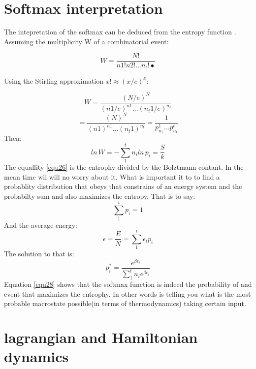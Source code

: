 \documentclass[journal]{IEEEtai}
\begin{document}
\section{Softmax interpretation}

The intepretation of the softmax can be deduced from the entropy function \cite{MDF}. Assuming the multiplicity $\text{W}$ of a combinatorial event:

\begin{equation}\label{equ23}
W = \frac{N!}{n1!n2!...n_{t}!•}
\end{equation}

Using the Stirling approximation $x!\approx(x/e)^{x}$:

\begin{equation}\label{equ24}
W = \frac{(N/e)^{N}}{(n1/e)^{n1}...(n_{t}1/e)^{n_{t}}}
\end{equation}
\begin{equation}\label{equ25}
= \frac{(N)^{N}}{(n1)^{n1}...(n_{t}1)^{n_{t}}}=\frac{1}{p^{1}_{n_{1}}...p^{t}_{n_{t}}}
\end{equation}
Then:
\begin{equation}\label{equ26}
ln\, W =- \sum^{t}_{1}n_{i}ln\,p_{i} = \frac{S}{k}
\end{equation}
The equallity \eqref{equ26} is the entrophy divided by the Bolztmann contant. In the mean time wil will no worry about it. What is important it to to find a probablity distribution that obeys that constrains of an energy system and the probabilty sum and also maximizes the entropy. That is to say:
\begin{equation}\label{equ26}
\sum^{t}_{1}p_{i} = 1
\end{equation}
And the average energy: 
\begin{equation}\label{equ27}
\epsilon=\frac{E}{N} = \sum^{t}_{1}\epsilon_{i}p_{i}
\end{equation}
The solution to that is:
\begin{equation}\label{equ28}
p^{*}_{i} = \frac{e^{\beta\epsilon_{i}}}{\sum^{t}_{1}n_{i}e^{\beta\epsilon_{i}}}
\end{equation}
Equation \eqref{equ28} shows that the softmax function is indeed the probability of and event that maximizes the entrophy. In other words is telling you what is the most probable macrostate possible(in terms of thermodynamics) taking certain input.

\section{lagrangian and Hamiltonian dynamics}
\end{document}
